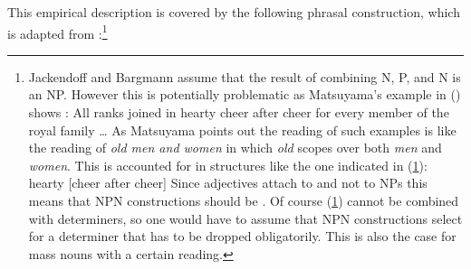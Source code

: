 \documentclass[output=paper]{langsci/langscibook}
\begin{document}
This empirical description is covered by the following phrasal construction, which is adapted from
:\footnote{%
Jackendoff and Bargmann assume that the result of combining N, P, and N is an NP. However this is
potentially problematic as Matsuyama's example in () shows \citep[]{Matsuyama2004a}:
\ea
All ranks joined in hearty cheer after cheer for every member of the royal family \ldots
\z
As Matsuyama points out the reading of such examples is like the reading of \emph{old men and women}
in which \emph{old} scopes over both \emph{men} and \emph{women}. This is accounted for in
structures like the one indicated in (\ref{ex-hearty-cheer-after-cheer}):
\ea
\label{ex-hearty-cheer-after-cheer}
hearty [cheer after cheer]
\z
Since adjectives attach to \nbars and not to NPs this means that NPN constructions should be
\nbars. Of course (\ref{ex-hearty-cheer-after-cheer}) cannot be combined with determiners, so one would have to assume that
NPN constructions select for a determiner that has to be dropped obligatorily. This is also the case
for mass nouns with a certain reading.
}
\ea
\label{ex-npn-bragmann}
\end{document}
